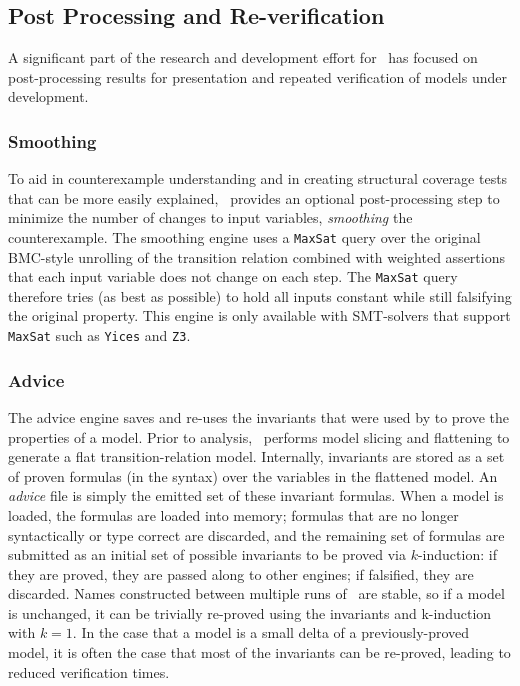 \subsection{Post Processing and Re-verification}

A significant part of the research and development effort for \jkind\ has focused on
post-processing results for presentation and repeated verification of models under development.



\subsubsection{Smoothing}

To aid in counterexample understanding and in creating structural coverage tests that can be more easily explained, \jkind\ provides an optional post-processing step to minimize the number of changes to input variables, {\em smoothing} the counterexample.
The smoothing engine uses a \texttt{MaxSat} query over
the original BMC-style unrolling of the transition relation combined
with weighted assertions that each input variable does not change on
each step. The \texttt{MaxSat} query therefore tries (as best as
possible) to hold all inputs constant while still falsifying the
original property. This engine is only available with SMT-solvers that
support \texttt{MaxSat} such as \texttt{Yices} and \texttt{Z3}.

\subsubsection{Advice}

The advice engine saves and re-uses the invariants that were used by \jkind to prove the properties of a model.  Prior to analysis, \jkind\ performs model slicing and flattening to generate a flat transition-relation model.  Internally, invariants are stored as a set of proven formulas (in the \lustre syntax) over the variables in the flattened model.  An {\em advice} file is simply the emitted set of these invariant formulas.  When a model is loaded, the formulas are loaded into memory; formulas that are no longer syntactically or type correct are discarded, and the remaining set of formulas are submitted as an initial set of possible invariants to be proved via $k$-induction: if they are proved, they are passed along to other engines; if falsified, they are discarded.
%
Names constructed between multiple runs of \jkind\ are stable, so if a model is unchanged, it can be trivially re-proved using the invariants and k-induction with $k=1$.  In the case that a model is a small delta of a previously-proved model, it is often the case that most of the invariants can be re-proved, leading to reduced verification times.


